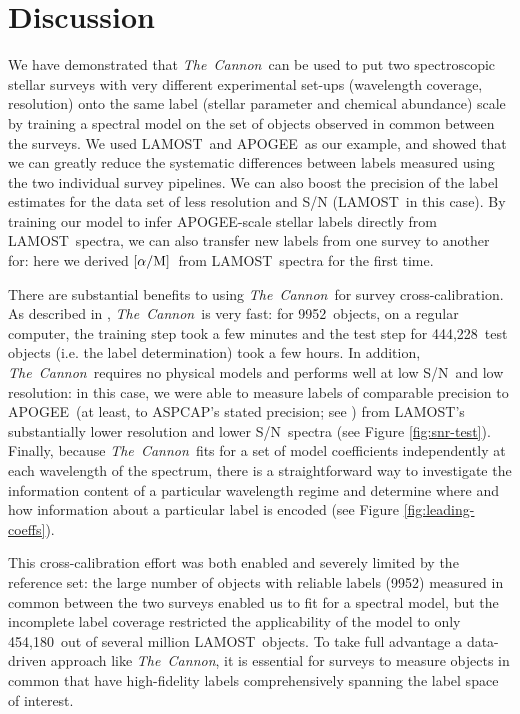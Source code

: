 \documentclass[12pt, letterpaper, preprint]{aastex}
\newcommand{\tc}{\textsl{The~Cannon}}
\newcommand{\apogee}{APOGEE}
\newcommand{\aspcap}{ASPCAP}
\newcommand{\lamost}{LAMOST}
\newcommand{\alphafe}{\mbox{$\rm [\alpha/M]$}}
\newcommand{\ntrobj}{9952}
\newcommand{\nallobj}{454,180}
\newcommand{\ntestobj}{444,228}
\newcommand{\snr}{S/N}
\begin{document}
\section{Discussion}

We have demonstrated that \tc\ can be used to put two 
spectroscopic stellar surveys with very different experimental set-ups (wavelength coverage, resolution) onto the same label (stellar parameter and chemical abundance)
scale by training a spectral model on the set of objects observed in common between
the surveys. We used \lamost\ and \apogee\ as our example, and showed that we can greatly reduce the systematic differences between labels measured using the two individual survey pipelines. 
We can also boost the precision of the label estimates for the data set of less resolution and S/N (\lamost\ in this case).  By training our model to
infer \apogee -scale stellar labels directly from \lamost\ spectra, we
can also transfer new labels from one survey to another for: here we derived \alphafe\ 
from \lamost\ spectra for the first time. 

There are substantial benefits to using \tc\ for survey cross-calibration. As described in \citep{Ness2015}, \tc\ is very fast:
for \ntrobj\ objects, on a regular computer,
the training step took a few minutes and 
the test step for \ntestobj\ test objects 
(i.e. the label determination) took a few hours.
In addition, \tc\ requires no physical models and performs well
at low \snr\ and low resolution: in this case, we were able to measure
labels of comparable precision to \apogee\ (at least, to 
\aspcap's stated precision; see \citet{Ness2015})
from \lamost's substantially lower resolution and lower \snr\ spectra (see Figure \ref{fig:snr-test}).
Finally, because \tc\ fits for a set of model coefficients independently at each wavelength of the spectrum, 
there is a straightforward way to investigate the information content 
of a particular wavelength regime and determine where and how
information about a particular label is encoded (see Figure \ref{fig:leading-coeffs}).

This cross-calibration effort was both enabled and severely limited
by the reference set: the large number of objects with reliable labels (\ntrobj) measured in common between the two surveys enabled us to fit for a spectral model, but the incomplete label coverage 
restricted the applicability of the model to only \nallobj\ out of
several million \lamost\ objects. To take full advantage a data-driven approach like \tc, it is essential
for surveys to measure objects in common that have
high-fidelity labels comprehensively spanning the label space
of interest. 
\end{document}
